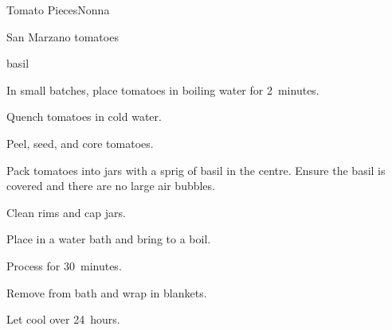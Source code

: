 \begin{recipe}{Tomato Pieces}{Nonna}{}

\begin{ingredients}
\item San Marzano tomatoes
\item basil
\end{ingredients}

\begin{directions}
\item In small batches, place tomatoes in boiling water for 2~minutes.
\item Quench tomatoes in cold water.
\item Peel, seed, and core tomatoes.
\item Pack tomatoes into jars with a sprig of basil in the centre. Ensure the basil is covered and there are no large air bubbles.
\item Clean rims and cap jars.
\item Place in a water bath and bring to a boil.
\item Process for 30~minutes.
\item Remove from bath and wrap in blankets.
\item Let cool over 24~hours.
\end{directions}

\end{recipe}
